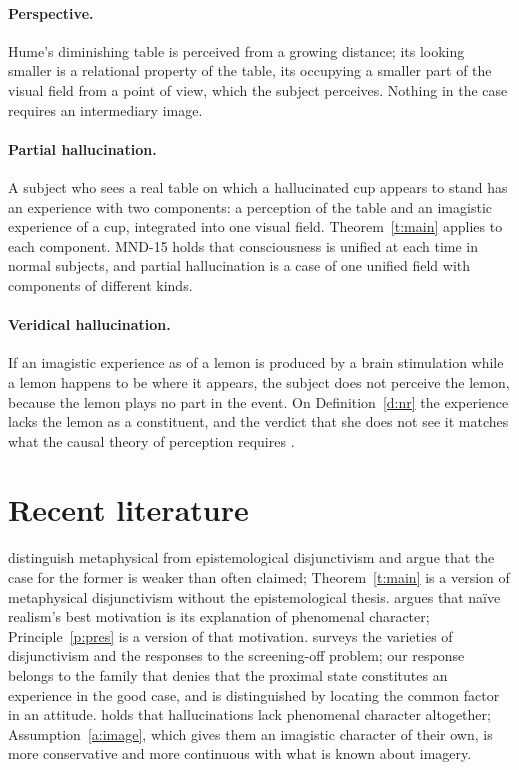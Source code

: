 \documentclass{situationist-preprint}
\begin{document}
\paragraph{Perspective.} Hume's diminishing table is perceived from a growing distance; its looking smaller is a relational property of the table, its occupying a smaller part of the visual field from a point of view, which the subject perceives. Nothing in the case requires an intermediary image.

\paragraph{Partial hallucination.} A subject who sees a real table on which a hallucinated cup appears to stand has an experience with two components: a perception of the table and an imagistic experience of a cup, integrated into one visual field. Theorem~\ref{t:main} applies to each component. MND-15 holds that consciousness is unified at each time in normal subjects, and partial hallucination is a case of one unified field with components of different kinds.

\paragraph{Veridical hallucination.} If an imagistic experience as of a lemon is produced by a brain stimulation while a lemon happens to be where it appears, the subject does not perceive the lemon, because the lemon plays no part in the event. On Definition~\ref{d:nr} the experience lacks the lemon as a constituent, and the verdict that she does not see it matches what the causal theory of perception requires \citep{Snowdon1981}.

\section{Recent literature}

\citet{ByrneLogue2008} distinguish metaphysical from epistemological disjunctivism and argue that the case for the former is weaker than often claimed; Theorem~\ref{t:main} is a version of metaphysical disjunctivism without the epistemological thesis. \citet{Logue2012} argues that naïve realism's best motivation is its explanation of phenomenal character; Principle~\ref{p:pres} is a version of that motivation. \citet{Soteriou2014} surveys the varieties of disjunctivism and the responses to the screening-off problem; our response belongs to the family that denies that the proximal state constitutes an experience in the good case, and is distinguished by locating the common factor in an attitude. \citet{Fish2009} holds that hallucinations lack phenomenal character altogether; Assumption~\ref{a:image}, which gives them an imagistic character of their own, is more conservative and more continuous with what is known about imagery.
\end{document}
